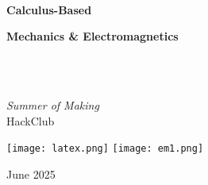 \documentclass[a4paper, 11pt]{book}
\begin{document}
\begin{titlepage}
    \thispagestyle{empty}
    
    \begin{center}
        \vspace*{1.5cm}

        \hrulefill \\ [.8em]

        {\fontsize{36}{44}\bfseries Calculus-Based}
        
        \vspace{0.45cm}
        
        \begin{minipage}{0.9\textwidth}
            \centering
            {\fontsize{42}{50}\selectfont\color{blue}\bfseries
            Mechanics \color{black}\&\vspace*{0.3cm}
            \color{red}Electromagnetics}
        \end{minipage} \\ [.25em]

        \hrulefill \\

        \vspace{.8cm}
    
        {\Large\color{gray}\textit{Summer of Making}}\\[0.3em]
        {\large\color{gray}HackClub}
        
    
		\vspace{3cm}
        
        \begin{minipage}{0.8\textwidth}
            \centering
            \texttt{[image: latex.png]}\hspace{1.5cm}
            \texttt{[image: em1.png]}
        \end{minipage}
        
        \vspace{3.7cm}
        
        {\small June 2025}
        
    \end{center}
\end{titlepage}
\end{document}
